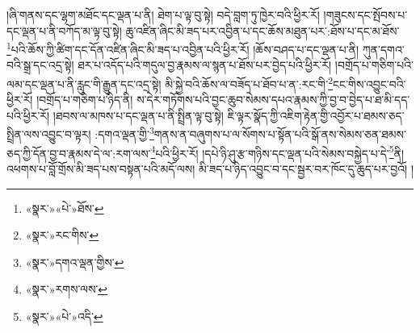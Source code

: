 །ཞི་གནས་དང་ལྷག་མཐོང་དང་ལྡན་པ་ནི། ཐེག་པ་ལྟ་བུ་སྟེ། བདེ་བླག་ཏུ་ཁྱེར་བའི་ཕྱིར་རོ། །གཟུངས་དང་སྤོབས་པ་དང་ལྡན་པ་ནི་བཀོད་མ་ལྟ་བུ་སྟེ། ཆུ་འཛིན་ཞིང་མི་ཟད་པར་འབྱིན་པ་དང་ཆོས་མཐུན་པར་:ཐོས་པ་དང་མ་ཐོས་\footnote{«སྣར་»«པེ་»ཐོས་}པའི་ཆོས་ཀྱི་ཚིག་དང་དོན་འཛིན་ཞིང་མི་ཟད་པ་འབྱིན་པའི་ཕྱིར་རོ། །ཆོས་བཤད་པ་དང་ལྡན་པ་ནི། ཀུན་དགའ་བའི་སྒྲ་དང་འདྲ་སྟེ། ཐར་པ་འདོད་པའི་གདུལ་བྱ་རྣམས་ལ་སྙན་པ་ཐོས་པར་བྱེད་པའི་ཕྱིར་རོ། །བགྲོད་པ་གཅིག་པའི་ལམ་དང་ལྡན་པ་ནི་རླུང་གི་རྒྱུན་དང་འདྲ་སྟེ། མི་སྐྱེ་བའི་ཆོས་ལ་བཟོད་པ་ཐོབ་པ་ན་:རང་གི་\footnote{«སྣར་»རང་གིས་}ངང་གིས་འབྱུང་བའི་ཕྱིར་རོ། །བགྲོད་པ་གཅིག་པ་ཉིད་ནི། ས་དེར་གཏོགས་པའི་བྱང་ཆུབ་སེམས་དཔའ་རྣམས་ཀྱི་བྱ་བ་བྱེད་པ་ཐ་མི་དད་པའི་ཕྱིར་རོ། །ཐབས་ལ་མཁས་པ་དང་ལྡན་པ་ནི་སྤྲིན་ལྟ་བུ་སྟེ། ཇི་ལྟར་སྣོད་ཀྱི་འཇིག་རྟེན་གྱི་འབྱོར་པ་ཐམས་ཅད་སྤྲིན་ལས་འབྱུང་བ་ལྟར། :དགའ་ལྡན་གྱི་\footnote{«སྣར་»དགའ་ལྡན་གྱིས་}གནས་ན་བཞུགས་པ་ལ་སོགས་པ་སྟོན་པའི་སྒོ་ནས་སེམས་ཅན་ཐམས་ཅད་ཀྱི་དོན་བྱ་བ་རྣམས་དེ་ལ་:རག་ལས་\footnote{«སྣར་»རགས་ལས་}པའི་ཕྱིར་རོ། །དཔེ་ཉི་ཤུ་རྩ་གཉིས་དང་ལྡན་པའི་སེམས་བསྐྱེད་པ་དེ་\footnote{«སྣར་»«པེ་»འདི་}ནི། འཕགས་པ་བློ་གྲོས་མི་ཟད་པས་བསྟན་པའི་མདོ་ལས། མི་ཟད་པ་ཉིད་འབྱུང་བ་དང་སྦྱར་བར་ཁོང་དུ་ཆུད་པར་བྱའོ། །
